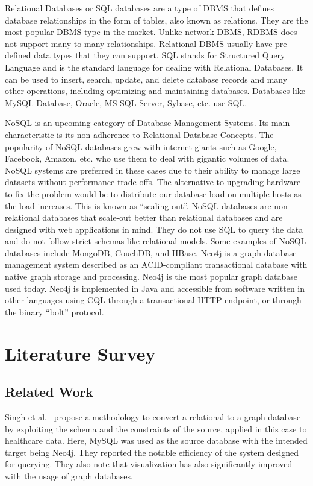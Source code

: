 \documentclass[12pt]{article}
\newcommand{\sectionfontstyle}{\fontsize{16pt}{1em}\usefont{T1}{phv}{b}{n}}
\begin{document}
    Relational Databases or SQL databases are a  type of DBMS that defines database relationships in the form of tables, also known as relations. They are the most popular DBMS type in the market. Unlike network DBMS, RDBMS does not support many to many relationships. Relational DBMS usually have pre-defined data types that they can support. SQL stands for Structured Query Language and is the standard language for dealing with Relational Databases. It can be used to insert, search, update, and delete database records and many other operations, including optimizing and maintaining databases. Databases like MySQL Database, Oracle, MS SQL Server, Sybase, etc. use SQL.

    NoSQL is an upcoming category of Database Management Systems. Its main characteristic is its non-adherence to Relational Database Concepts. The popularity of NoSQL databases grew with internet giants such as Google, Facebook, Amazon, etc. who use them to deal with gigantic volumes of data. NoSQL systems are preferred in these cases due to their ability to manage large datasets without performance trade-offs. The alternative to upgrading hardware to fix the problem would be to distribute our database load on multiple hosts as the load increases. This is known as ``scaling out''. NoSQL databases are non-relational databases that scale-out better than relational databases and are designed with web applications in mind. They do not use SQL to query the data and do not follow strict schemas like relational models. Some examples of NoSQL databases include MongoDB, CouchDB, and HBase.
    Neo4j is a graph database management system described as an ACID-compliant transactional database with native graph storage and processing. Neo4j is the most popular graph database used today. Neo4j is implemented in Java and accessible from software written in other languages using CQL through a transactional HTTP endpoint, or through the binary ``bolt'' protocol.

    \newpage

    \section{\sectionfontstyle Literature Survey}
    \subsection{Related Work}
    Singh et al.~\cite{base_paper} propose a methodology to convert a relational to a graph database by exploiting the schema and the constraints of the source, applied in this case to healthcare data. Here, MySQL was used as the source database with the intended target being Neo4j. They reported the notable efficiency of the system designed for querying. They also note that visualization has also significantly improved with the usage of graph databases.
\end{document}
